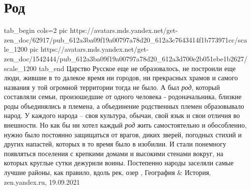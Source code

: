  
 
 
 
 
\chapter{Род}

\ifcmt
  tab_begin cols=2
     pic https://avatars.mds.yandex.net/get-zen_doc/62917/pub_612a3ba09f19a00797a78d20_612a3c7643414f1b773971cc/scale_1200
     pic https://avatars.mds.yandex.net/get-zen_doc/1542444/pub_612a3ba09f19a00797a78d20_612a3d700e2b051ebe1b2627/scale_1200
  tab_end
\fi
Царство Русское еще не образовалось, не построили еще люди, жившие в то далекое
время ни городов, ни прекрасных храмов и самого названия у той огромной
территории тогда не было.  А был \emph{род}, который составляли семьи,
произошедшие от одного человека - родоначальника, близкие роды объединялись в
племена, а объединение родственных племен образовывало народ. У каждого народа
– своя культура, обычаи, свой язык и свои отличия во внешности.  Но как бы ни
хотел каждый \emph{род} жить самостоятельно и обособленно, нужно было постоянно
защищаться от врагов, диких зверей, погодных стихий и других напастей, которых
в то время было в изобилии.  И стали понемногу появляться поселения с крепкими
домами и высокими стенами вокруг, на которых круглые сутки дежурили воины.
Постепенно народы заселяли самые лучшие районы, как правило, вдоль рек, озер
, 
География \& История, zen.yandex.ru, 19.09.2021
